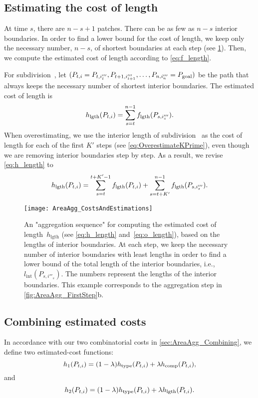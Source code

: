 \subsection{Estimating the cost of length}
\label{sec:AreaAgg_h_length}

At time $s$, there are $n-s+1$ patches.
There can be as few as $n-s$ interior boundaries.
In order to find a lower bound for the cost of length,
we keep only the necessary number, $n-s$, 
of shortest boundaries at each step
(see \fig\ref{fig:AreaAgg_h_length}).
Then, we compute the estimated cost of length according to 
\eq\ref{eq:f_length}.

For subdivision~\Pnode, let
$(P_{t,i}=P_{t,i'''_t}, P_{t+1,i'''_{t+1}}, 
\dots,P_{n,i'''_n}=P_\mathrm{goal})$
be the path that always keeps 
the necessary number of shortest interior boundaries.
The estimated cost of length is
\begin{equation}
\label{eq:h_length}
h_\mathrm{lgth}(P_{t,i})=
\sum_{s=t}^{n-1}f_\mathrm{lgth}(P_{s,i'''_s}).
\end{equation}
When overestimating,
we use the interior length of subdivision~\Pnode
as the cost of length for each of the first $K'$ steps 
(see \eq\ref{eq:OverestimateKPrime}),
even though we are removing interior boundaries
step by step.
As a result, we revise \fo\ref{eq:h_length} to
\begin{equation}
\label{eq:o_length}
h_\mathrm{lgth}(P_{t,i})=
\sum_{s=t}^{t+K'-1}f_\mathrm{lgth}(P_{t,i})+
\sum_{s=t+K'}^{n-1}f_\mathrm{lgth}(P_{s,i'''_s}).
\end{equation}


\begin{figure*}[htb]
\centering
\texttt{[image: AreaAgg\_CostsAndEstimations]}
\caption{An "aggregation sequence" for computing 
	the estimated cost of length~$h_\mathrm{lgth}$ 
	(see \eqs\ref{eq:h_length} and~\ref{eq:o_length}),
	based on the lengths of interior boundaries. 
	At each step, we keep the necessary number 
	of interior boundaries with least lengths in order to find a 
	lower bound of the total length of the interior boundaries, 
	i.e., $l_\mathrm{int}(P_{s,i'''_s})$.
	The numbers represent the 
	lengths of the interior boundaries.
	This example corresponds to the aggregation step in 
	\fig\ref{fig:AreaAgg_FirstStep}b.
}
\label{fig:AreaAgg_h_length}
\end{figure*}


\subsection{Combining estimated costs}
\label{sec:AreaAgg_CombinationEstimated}
In accordance 
with our two combinatorial costs in 
\sect\ref{sec:AreaAgg_Combining},
we define two estimated-cost functions:
\begin{equation}
\label{eq:h_1}
h_1(P_{t,i})=
(1-\lambda)h_\mathrm{type}(P_{t,i})
+\lambda h_{\mathrm{comp}}(P_{t,i}),
\end{equation}
and
\begin{equation}
\label{eq:h_2}
h_2(P_{t,i})=
(1-\lambda)h_\mathrm{type}(P_{t,i})
+\lambda h_{\mathrm{lgth}}(P_{t,i}).
\end{equation}



